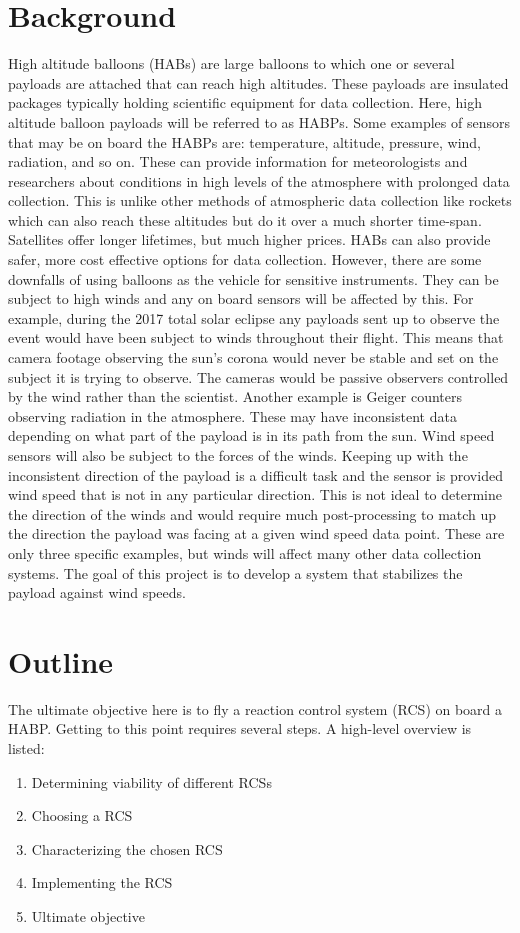 \section{Background}
High altitude balloons (HABs) are large balloons to which one or several payloads are attached that can reach high altitudes. These payloads are insulated packages typically holding scientific equipment for data collection. Here, high altitude balloon payloads will be referred to as HABPs. Some examples of sensors that may be on board the HABPs are: temperature, altitude, pressure, wind, radiation, and so on. These can provide information for meteorologists and researchers about conditions in high levels of the atmosphere with prolonged data collection. This is unlike other methods of atmospheric data collection like rockets which can also reach these altitudes but do it over a much shorter time-span. Satellites offer longer lifetimes, but much higher prices. HABs can also provide safer, more cost effective options for data collection. However, there are some downfalls of using balloons as the vehicle for sensitive instruments. They can be subject to high winds and any on board sensors will be affected by this. For example, during the 2017 total solar eclipse any payloads sent up to observe the event would have been subject to winds throughout their flight. This means that camera footage observing the sun's corona would never be stable and set on the subject it is trying to observe. The cameras would be passive observers controlled by the wind rather than the scientist. Another example is Geiger counters observing radiation in the atmosphere. These may have inconsistent data depending on what part of the payload is in its path from the sun. Wind speed sensors will also be subject to the forces of the winds. Keeping up with the inconsistent direction of the payload is a difficult task and the sensor is provided wind speed that is not in any particular direction. This is not ideal to determine the direction of the winds and would require much post-processing to match up the direction the payload was facing at a given wind speed data point. These are only three specific examples, but winds will affect many other data collection systems. The goal of this project is to develop a system that stabilizes the payload against wind speeds. 
\section{Outline}
The ultimate objective here is to fly a reaction control system (RCS) on board a HABP. Getting to this point requires several steps. A high-level overview is listed:
\begin{enumerate}
\item Determining viability of different RCSs
\item Choosing a RCS
\item Characterizing the chosen RCS
\item Implementing the RCS
\item Ultimate objective
\end{enumerate}
